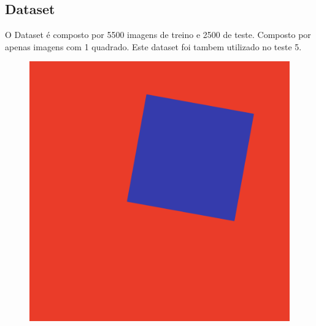\subsection{Dataset}
O Dataset é composto por 5500 imagens de treino e 2500 de teste. Composto por apenas imagens com 1 quadrado. 
Este dataset foi tambem utilizado no teste 5.
    \begin{figure}[H]
        \centering
        \includegraphics[width=0.25\linewidth]{imgs/Test_8/dataset/square_22.png}
        \label{fig:enter-label}
    \end{figure}
